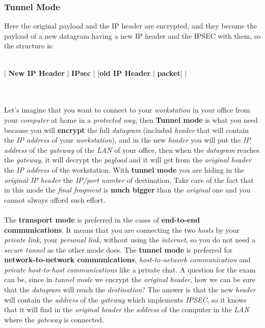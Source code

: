 \documentclass{article}
\begin{document}
\subsubsection{Tunnel Mode}
Here the original payload and the IP header are encrypted, and they become the payload of a new datagram having a new IP header and the IPSEC with them, so the structure is: \\\\
\centerline{$|$ \textbf{New IP Header} $|$ \textbf{IPsec} $|$ $[$\textbf{old IP Header} $|$ \textbf{packet}$]$ $|$}\\\\
Let's imagine that you want to connect to your \emph{workstation} in your office from your \emph{computer} at home in a \emph{protected way}, then \textbf{Tunnel mode} is what you need because you will \textbf{encrypt} the full \emph{datagram} (included \emph{header} that will contain the \emph{IP address} of your \emph{workstation}), and in the new \emph{header} you will put the \emph{IP address} of the \emph{gateway} of the \emph{LAN} of your office, then when the \emph{datagram} reaches the \emph{gateway}, it will decrypt the \emph{payload} and it will get from the \emph{original header} the \emph{IP address} of the workstation. With \textbf{tunnel mode} you are hiding in the \emph{original IP header} the \emph{IP/port number} of destination. Take care of the fact that in this mode the \emph{final fragment} is \textbf{much bigger} than the \emph{original} one and you cannot always afford such effort. \\\\
The \textbf{transport mode} is preferred in the cases of \textbf{end-to-end communications}. It means that you are connecting the two \emph{hosts} by your \emph{private link}, your \emph{personal link}, without using the \emph{internet}, so you do not need a \emph{secure tunnel} as the other mode does. The \textbf{tunnel mode} is preferred for \textbf{network-to-network communications}, \emph{host-to-network communication} and \emph{private host-to-host communications} like a private chat. A question for the exam can be, since in \emph{tunnel mode} we encrypt the \emph{original header}, how we can be sure that the \emph{datagram} will reach the \emph{destination}? The answer is that the new \emph{header} will contain the \emph{address} of the \emph{gateway} which implements \emph{IPSEC}, so it knows that it will find in the \emph{original header} the \emph{address} of the computer in the \emph{LAN} where the \emph{gateway} is connected. 
\end{document}
